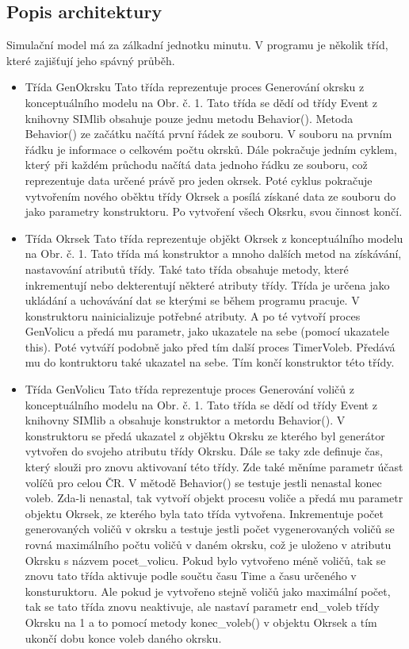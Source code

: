 \documentclass[12pt,a4paper,titlepage,final]{article}
\begin{document}
\subsection{Popis architektury}
Simulační model má za zálkadní jednotku minutu. \newline
V programu je několik tříd, které zajišťují jeho spávný průběh. 
 \begin{itemize}
\item Třída GenOkrsku
\subitem Tato třída reprezentuje proces Generování okrsku z konceptuálního modelu na Obr. č. 1. Tato třída se dědí od třídy Event z knihovny SIMlib obsahuje pouze jednu metodu Behavior(). Metoda Behavior() ze začátku načítá první řádek ze souboru. V souboru na prvním řádku je informace o celkovém počtu okrsků. Dále pokračuje jedním cyklem, který při každém průchodu načítá data jednoho řádku ze souboru, což reprezentuje data určené právě pro jeden okrsek. Poté cyklus pokračuje vytvořením nového oběktu třídy Okrsek a posílá získané data ze souboru do jako parametry konstruktoru. Po vytvoření všech Oksrku, svou činnost končí.
\newpage
\item Třída Okrsek
\subitem Tato třída reprezentuje objěkt Okrsek z konceptuálního modelu na Obr. č. 1. Tato třída má konstruktor a mnoho dalších metod na získávání, nastavování atributů třídy. Také tato třída obsahuje metody, které inkrementují nebo dekterentují některé atributy třídy. Třída je určena jako ukládání a uchovávání dat se kterými se během programu pracuje. V konstruktoru nainicializuje potřebné atributy. A po té vytvoří proces GenVolicu a předá mu parametr, jako ukazatele na sebe (pomocí ukazatele this). Poté vytváří podobně jako před tím další proces TimerVoleb. Předává mu do kontruktoru také ukazatel na sebe. Tím končí konstruktor této třídy.

\item Třída GenVolicu
\subitem Tato třída reprezentuje proces Generování voličů z konceptuálního modelu na Obr. č. 1. Tato třída se dědí od třídy Event z knihovny SIMlib a obsahuje konstruktor a metordu Behavior(). V konstruktoru se předá ukazatel z objěktu Okrsku ze kterého byl generátor vytvořen do svojeho atributu třídy Okrsku. Dále se taky zde definuje čas, který slouži pro znovu aktivovaní této třídy. Zde také měníme parametr účast volíčů pro celou ČR. V mětodě Behavior() se testuje jestli nenastal konec voleb. Zda-li nenastal, tak vytvoří objekt procesu voliče a předá mu parametr objektu Okrsek, ze kterého byla tato třída vytvořena. Inkrementuje počet generovaných voličů v okrsku a testuje jestli počet vygenerovaných voličů se rovná maximálního počtu voličů v daném okrsku, což je uloženo v atributu Okrsku s názvem pocet\_volicu. Pokud bylo vytvořeno méně voličů, tak se znovu tato třída aktivuje podle součtu času Time a času určeného v konsturuktoru. Ale pokud je vytvořeno stejně voličů jako maximální počet, tak se tato třída znovu neaktivuje, ale nastaví parametr end\_voleb třídy Okrsku na 1 a to pomocí metody konec\_voleb() v objektu Okrsek a tím ukončí dobu konce voleb daného okrsku. 


\end{itemize}
\end{document}
